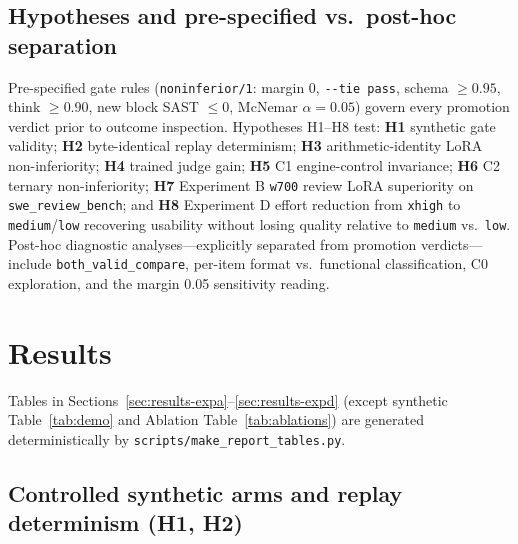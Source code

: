 \documentclass[conference]{IEEEtran}
\begin{document}
\subsection{Hypotheses and pre-specified vs.\ post-hoc separation}
\label{sec:method-hypotheses}

Pre-specified gate rules (\texttt{noninferior/\allowbreak{}1}: margin 0, \texttt{-{}-{}tie pass}, schema $\ge 0.95$, think $\ge 0.90$, new block SAST $\le 0$, McNemar $\alpha=0.05$) govern every promotion verdict prior to outcome inspection. Hypotheses H1--H8 test: \textbf{H1} synthetic gate validity; \textbf{H2} byte-identical replay determinism; \textbf{H3} arithmetic-identity LoRA non-inferiority; \textbf{H4} trained judge gain; \textbf{H5} C1 engine-control invariance; \textbf{H6} C2 ternary non-inferiority; \textbf{H7} Experiment B \texttt{w700} review LoRA superiority on \texttt{swe\_\allowbreak{}review\_\allowbreak{}bench}; and \textbf{H8} Experiment D effort reduction from \texttt{xhigh} to \texttt{medium}/\texttt{low} recovering usability without losing quality relative to \texttt{medium} vs.\ \texttt{low}. Post-hoc diagnostic analyses---explicitly separated from promotion verdicts---include \texttt{both\_\allowbreak{}valid\_\allowbreak{}compare}, per-item format vs.\ functional classification, C0 exploration, and the margin 0.05 sensitivity reading.

\section{Results}
\label{sec:results}

Tables in Sections~\ref{sec:results-expa}--\ref{sec:results-expd} (except synthetic Table~\ref{tab:demo} and Ablation Table~\ref{tab:ablations}) are generated deterministically by \texttt{scripts/\allowbreak{}make\_\allowbreak{}report\_\allowbreak{}tables.\allowbreak{}py}.

\subsection{Controlled synthetic arms and replay determinism (H1, H2)}
\label{sec:results-h1h2}
\end{document}

